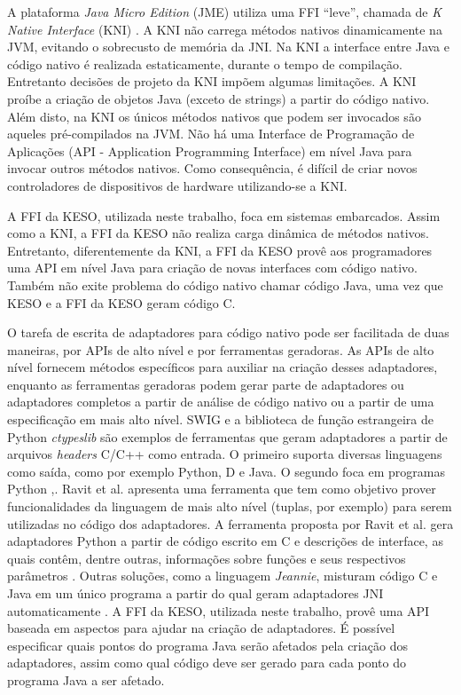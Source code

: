 A plataforma \emph{Java Micro Edition} (JME) utiliza uma FFI ``leve'',
chamada de \emph{K Native Interface} (KNI) \cite{_k_2002}. 
A KNI não carrega métodos nativos dinamicamente na JVM, evitando o sobrecusto 
de memória da JNI. 
Na KNI a interface entre Java e código nativo é realizada estaticamente, 
durante o tempo de compilação. 
Entretanto decisões de projeto da KNI impõem algumas limitações. 
A KNI proíbe a criação de objetos Java (exceto de strings) a partir do código 
nativo. 
Além disto, na KNI os únicos métodos nativos que podem ser invocados são aqueles 
pré-compilados na JVM. 
Não há uma Interface de Programação de Aplicações 
(API - Application Programming Interface) em nível Java para invocar outros 
métodos nativos. %
Como consequência, é difícil de criar novos controladores de dispositivos de 
hardware utilizando-se a KNI.

A FFI da KESO, utilizada neste trabalho, foca em sistemas embarcados. 
Assim como a KNI, a FFI da KESO não realiza carga dinâmica de métodos nativos.
Entretanto, diferentemente da KNI, a FFI da KESO provê aos programadores uma 
API em nível Java para criação de novas interfaces com código nativo. 
Também não exite problema do código nativo chamar código Java, uma vez que 
KESO e a FFI da KESO geram código C.

O tarefa de escrita de adaptadores para código nativo pode ser facilitada de
duas maneiras, por APIs de alto nível e por ferramentas geradoras. As APIs de
alto nível fornecem métodos específicos para auxiliar na criação desses adaptadores,
enquanto as ferramentas geradoras podem gerar parte de adaptadores ou adaptadores
completos a partir de análise de código nativo ou a partir de uma especificação
em mais alto nível.
SWIG e a biblioteca de função estrangeira de Python \emph{ctypeslib} são exemplos
de ferramentas que geram adaptadores a partir de arquivos \emph{headers} C/C++
como entrada. O primeiro suporta diversas linguagens como saída, como por exemplo
Python, D e Java. O segundo foca em programas Python 
\cite{swig-site},\cite{ctypeslib-site}.
Ravit et al. apresenta uma ferramenta que tem como objetivo prover funcionalidades
da linguagem de mais alto nível (tuplas, por exemplo) para serem utilizadas no 
código dos adaptadores. A ferramenta proposta por Ravit et al. gera adaptadores
Python a partir de código escrito em C e descrições de interface, as quais 
contêm, dentre outras, informações sobre funções e seus respectivos parâmetros
\cite{Ravitch:2009:AGL:1542476.1542516}.
Outras soluções, como a linguagem \emph{Jeannie}, misturam código C e Java em 
um único programa a partir do qual geram adaptadores JNI 
automaticamente \cite{1297030}.
A FFI da KESO, utilizada neste trabalho, provê uma API baseada em aspectos para
ajudar na criação de adaptadores. É possível especificar quais pontos do programa
Java serão afetados pela criação dos adaptadores, assim como qual código deve
ser gerado para cada ponto do programa Java a ser afetado.

